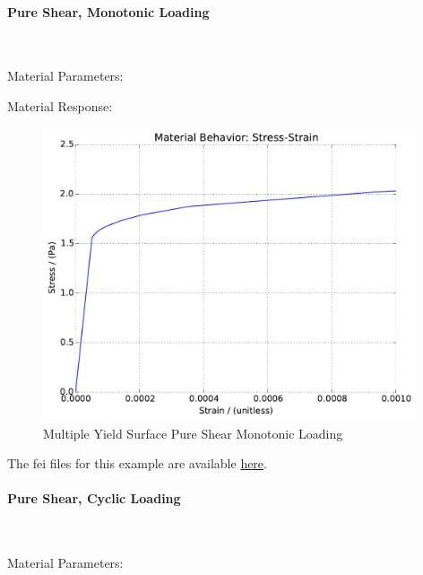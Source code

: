 \documentclass[fleqn,11pt]{article}
\begin{document}
\paragraph{Pure Shear, Monotonic Loading} ~

Material Parameters:


Material Response:
\begin{figure}[H]
\begin{center}
\includegraphics[width=11cm]{../fei_examples/Multi_Yield_Surface_von_Mises/1pure_shear_mono_loading/result.pdf}
\caption{
\label{Multiple Yield Surface Pure Shear Monotoni}
Multiple Yield Surface Pure Shear Monotonic Loading}
\end{center}
\end{figure}

The fei files for this example are available \href{https://github.com/yuan-energy/education_examples/tree/master/fei_examples/Multi_Yield_Surface_von_Mises/1pure_shear_mono_loading}{here}.

\newpage
\paragraph{Pure Shear, Cyclic Loading} ~

Material Parameters:

\end{document}
